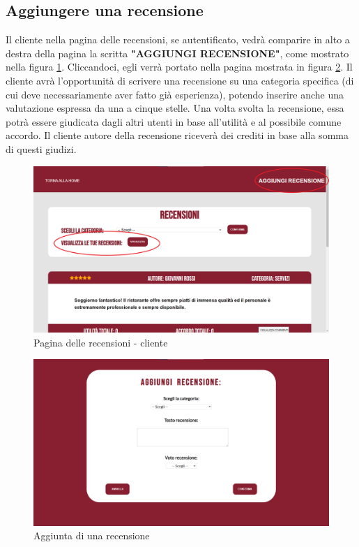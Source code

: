 \documentclass [a4paper, 12pt]{book}
\begin{document}
\subsection{Aggiungere una recensione}
Il cliente nella pagina delle recensioni, se autentificato, vedrà comparire in alto a destra della pagina la scritta \textbf{"AGGIUNGI RECENSIONE"}, come mostrato nella figura \ref{RecensioniCliente}. Cliccandoci, egli verrà portato nella pagina mostrata in figura \ref{AggiungiRecensione}. Il cliente avrà l'opportunità di scrivere una recensione su una categoria specifica (di cui deve necessariamente aver fatto già esperienza), potendo inserire anche una valutazione espressa da una a cinque stelle. Una volta svolta la recensione, essa potrà essere giudicata dagli altri utenti in base all'utilità e al possibile comune accordo. Il cliente autore della recensione riceverà dei crediti in base alla somma di questi giudizi.\newpage
\begin{figure}[!h]
\centering
\includegraphics[scale=0.3]{RecensioniCliente.png}
\caption{Pagina delle recensioni - cliente}
\label{RecensioniCliente}
\end{figure}

\begin{figure}[!h]
\centering
\includegraphics[scale=0.3]{AggiungiRecensione.png}
\caption{Aggiunta di una recensione}
\label{AggiungiRecensione}
\end{figure}
\end{document}
